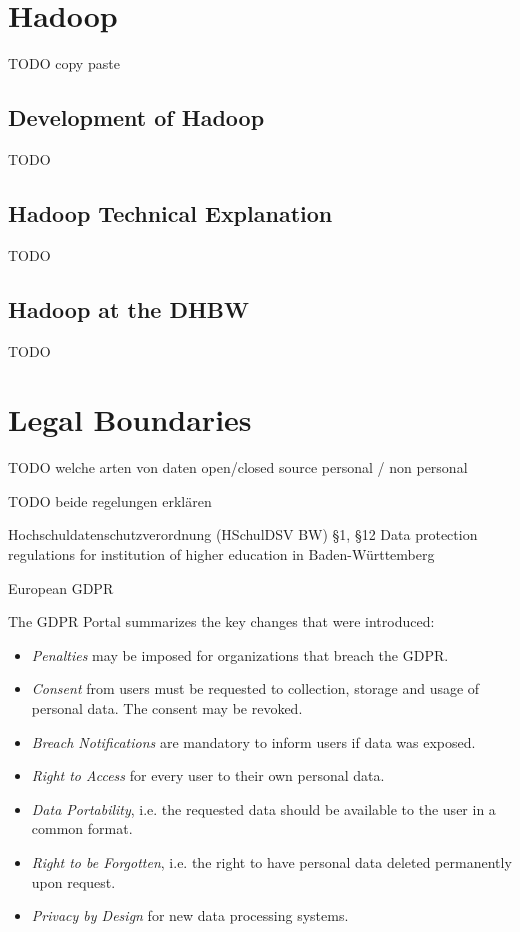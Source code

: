 \section{Hadoop}

TODO copy paste

\subsection{Development of Hadoop}

TODO

\subsection{Hadoop Technical Explanation}

TODO

\subsection{Hadoop at the DHBW}

TODO

\section{Legal Boundaries}

TODO welche arten von daten
open/closed source
personal / non personal

TODO beide regelungen erklären



Hochschuldatenschutzverordnung (HSchulDSV BW) §1, §12 \autocite{bw2012hcchuldsv}
Data protection regulations for institution of higher education in Baden-Württemberg

European \ac{GDPR} \autocite{eu2016gdpr}

The \ac{GDPR} Portal \autocite{trunomi2018gdpr} summarizes the key changes that were introduced:
\begin{itemize}
    \item \emph{Penalties} may be imposed for organizations that breach the \ac{GDPR}.
    \item \emph{Consent} from users must be requested to collection, storage and usage of personal data. The consent may be revoked.
    \item \emph{Breach Notifications} are mandatory to inform users if data was exposed.
    \item \emph{Right to Access} for every user to their own personal data.
    \item \emph{Data Portability}, i.e. the requested data should be available to the user in a common format.
    \item \emph{Right to be Forgotten}, i.e. the right to have personal data deleted permanently upon request.
    \item \emph{Privacy by Design} for new data processing systems.
\end{itemize}